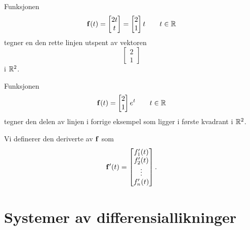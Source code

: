 \begin{ex}
Funksjonen 
\[
\mathbf{f}(t)=
\begin{bmatrix}
2t \\ t  
\end{bmatrix}
=
\begin{bmatrix}
2 \\ 1
\end{bmatrix}t
\qquad t \in \mathbb{R}
\]
tegner en den rette linjen utspent av vektoren
\[
\begin{bmatrix}
2 \\ 1
\end{bmatrix}
\]
 i $\mathbb{R}^2$. 
\end{ex}
\begin{ex}
Funksjonen 
\[
\mathbf{f}(t)=
\begin{bmatrix}
2 \\ 1  
\end{bmatrix}e^t
\qquad t \in \mathbb{R}
\]
tegner den delen av linjen i forrige eksempel som ligger i første kvadrant i $\mathbb{R}^2$. 
\end{ex}


\begin{defnx}
Vi definerer den deriverte av $\mathbf{f}$ som 
\[
\mathbf{f}'(t)=
\begin{bmatrix}
f'_1(t) \\ f'_2(t) \\ \vdots \\ f'_n(t)
\end{bmatrix}.
\]
\end{defnx}

\section*{Systemer av differensiallikninger}

